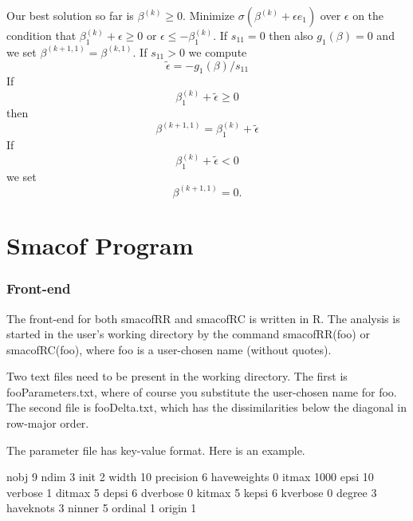 \documentclass[
  12pt,
]{article}
\newenvironment{Shaded}{\begin{snugshade}}{\end{snugshade}}
\newcommand{\DecValTok}[1]{\textcolor[rgb]{0.00,0.00,0.81}{#1}}
\newcommand{\NormalTok}[1]{#1}
\begin{document}
Our best solution so far is \(\beta^{(k)}\geq 0\). Minimize
\(\sigma(\beta^{(k)}+\epsilon e_1)\) over \(\epsilon\) on the condition that
\(\beta^{(k)}_1+\epsilon\geq 0\) or \(\epsilon\leq-\beta^{(k)}_1\). If
\(s_{11}=0\) then also \(g_1(\beta)=0\) and we set
\(\beta^{(k+1,1)}=\beta^{(k,1)}\). If \(s_{11}>0\) we compute \[
\tilde\epsilon=-g_1(\beta)/s_{11}
\] If \[
\beta^{(k)}_1+\tilde\epsilon\geq 0
\] then \[
\beta^{(k+1,1)}=\beta^{(k)}_1+\tilde\epsilon
\] If \[
\beta^{(k)}_1+\tilde\epsilon<0
\] we set \[
\beta^{(k+1,1)}=0.
\]

\section{Smacof Program}\label{smacof-program}

\subsubsection{Front-end}\label{front-end}

The front-end for both smacofRR and smacofRC is written in R. The
analysis is started in the user's working directory by the command
smacofRR(foo) or smacofRC(foo), where foo is a user-chosen name (without
quotes).

Two text files need to be present in the working directory. The first is
fooParameters.txt, where of course you substitute the user-chosen name
for foo. The second file is fooDelta.txt, which has the dissimilarities
below the diagonal in row-major order.

The parameter file has key-value format. Here is an example.

\begin{Shaded}
\begin{Highlighting}[]
\NormalTok{nobj   }\DecValTok{9}
\NormalTok{ndim   }\DecValTok{3}
\NormalTok{init   }\DecValTok{2}
\NormalTok{width   }\DecValTok{10}
\NormalTok{precision   }\DecValTok{6}
\NormalTok{haveweights   }\DecValTok{0}
\NormalTok{itmax  }\DecValTok{1000}
\NormalTok{epsi  }\DecValTok{10}
\NormalTok{verbose  }\DecValTok{1}
\NormalTok{ditmax  }\DecValTok{5}
\NormalTok{depsi  }\DecValTok{6}
\NormalTok{dverbose  }\DecValTok{0}
\NormalTok{kitmax  }\DecValTok{5}
\NormalTok{kepsi  }\DecValTok{6}
\NormalTok{kverbose  }\DecValTok{0}
\NormalTok{degree  }\DecValTok{3}
\NormalTok{haveknots  }\DecValTok{3}
\NormalTok{ninner  }\DecValTok{5}
\NormalTok{ordinal  }\DecValTok{1}
\NormalTok{origin  }\DecValTok{1}
\end{Highlighting}
\end{Shaded}
\end{document}

